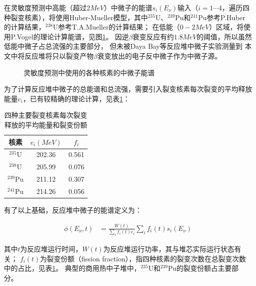 在灵敏度预测中高能（超过2$\si{MeV}$）中微子的能谱$s_i(E_\nu)$输入（$i=1\cdots4$，遍历四种裂变核素），将使用Huber-Mueller模型，其中${}^{235}\mathrm{U}$、${}^{239}\mathrm{Pu}$和${}^{241}\mathrm{Pu}$参考P.Huber的计算结果\cite{huber_determination_2011}，${}^{238}\mathrm{U}$参考T.A.Mueller的计算结果\cite{mueller_improved_2011}；
在低能（$0-2\si{MeV}$）区域，将使用P.Vogel的理论计算能谱\cite{p_vogel_neutrino_1989}，见图\ref{fig:neutrino_energy_spectrum}。
因逆$\beta$衰变反应有约$1.8\si{MeV}$的阈值，所以虽然低能中微子占总流强的主要部分，
但未被Daya Bay等反应堆中微子实验测量到\cite{an_improved_2017}
本文中将反应堆将只以裂变产物$\beta$衰变放出的电子反中微子作为中微子源。

\begin{figure}
    \centering
    
    \caption{\label{fig:neutrino_energy_spectrum} 灵敏度预测中使用的各种核素的中微子能谱}
\end{figure}

为了计算反应堆中微子的总能谱和总流强，需要引入裂变核素每次裂变的平均释放能量$e_i$，已有较精确的理论计算\cite{ma_improved_2013}，见表\ref{tab:per_fission}：

\begin{table}
  \centering
  \caption{四种主要裂变核素每次裂变释放的平均能量和裂变份额}
  \begin{tabular}{ccc}
    \toprule
    核素 & $e_i(\si{MeV})$ & $f_i$ \\
    \midrule
    ${}^{235}\mathrm{U}$ & 202.36 & 0.561 \\
    ${}^{238}\mathrm{U}$ & 205.99 & 0.076 \\
    ${}^{239}\mathrm{Pu}$ & 211.12 & 0.307 \\
    ${}^{241}\mathrm{Pu}$ & 214.26 & 0.056 \\
    \bottomrule
  \end{tabular}
  \label{tab:per_fission}
\end{table}

有了以上基础，反应堆中微子的能谱定义为：

\begin{align}
    \label{eq:sum_spectrum}
    \phi\left(E_\nu,t\right) &= \frac{W(t)}{\sum_i f_i(t)e_i}\sum_i f_i(t)s_i(E_\nu)
\end{align}

其中$t$为反应堆运行时间，$W(t)$为反应堆运行功率，其与堆芯实际运行状态有关\cite{juno_collaboration_tao_2020}；
$f_i(t)$为裂变份额（fission fraction），指四种核素的裂变次数在总裂变次数中的占比，见表\ref{tab:per_fission}。
典型的商用热中子堆中，${}^{235}\mathrm{U}$和${}^{239}\mathrm{Pu}$的裂变份额占主要部分。

